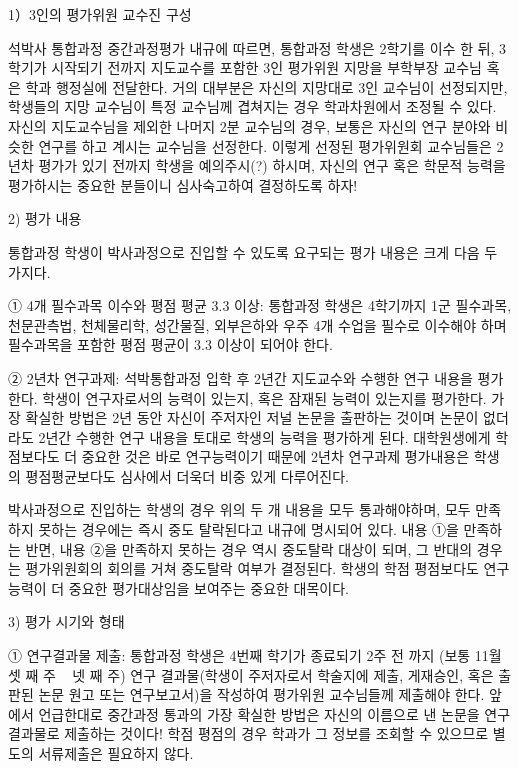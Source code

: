  
1）3인의 평가위원 교수진 구성

석박사 통합과정 중간과정평가 내규에 따르면, 통합과정 학생은 2학기를 이수 한 뒤,
3학기가 시작되기 전까지 지도교수를 포함한 3인 평가위원 지망을 부학부장 교수님
혹은 학과 행정실에 전달한다. 거의 대부분은 자신의 지망대로 3인 교수님이
선정되지만, 학생들의 지망 교수님이 특정 교수님께 겹쳐지는 경우 학과차원에서
조정될 수 있다. 자신의 지도교수님을 제외한 나머지 2분 교수님의 경우, 보통은
자신의 연구 분야와 비슷한 연구를 하고 계시는 교수님을 선정한다.  이렇게 선정된
평가위원회 교수님들은 2년차 평가가 있기 전까지 학생을 예의주시(?) 하시며, 자신의
연구 혹은 학문적 능력을 평가하시는 중요한 분들이니 심사숙고하여 결정하도록 하자!

2) 평가 내용

통합과정 학생이 박사과정으로 진입할 수 있도록 요구되는 평가 내용은 크게 다음 두
가지다.

① 4개 필수과목 이수와 평점 평균 3.3 이상: 통합과정 학생은 4학기까지 1군 필수과목,
천문관측법, 천체물리학, 성간물질, 외부은하와 우주 4개 수업을 필수로 이수해야 하며
필수과목을 포함한 평점 평균이 3.3 이상이 되어야 한다.

② 2년차 연구과제: 석박통합과정 입학 후 2년간 지도교수와 수행한 연구 내용을
평가한다. 학생이 연구자로서의 능력이 있는지, 혹은 잠재된 능력이 있는지를
평가한다.  가장 확실한 방법은 2년 동안 자신이 주저자인 저널 논문을 출판하는
것이며 논문이 없더라도 2년간 수행한 연구 내용을 토대로 학생의 능력을 평가하게
된다.  대학원생에게 학점보다도 더 중요한 것은 바로 연구능력이기 때문에 2년차
연구과제 평가내용은 학생의 평점평균보다도 심사에서 더욱더 비중 있게 다루어진다.

박사과정으로 진입하는 학생의 경우 위의 두 개 내용을 모두 통과해야하며, 모두
만족하지 못하는 경우에는 즉시 중도 탈락된다고 내규에 명시되어 있다.  내용 ①을
만족하는 반면, 내용 ②을 만족하지 못하는 경우 역시 중도탈락 대상이 되며, 그 반대의
경우는 평가위원회의 회의를 거쳐 중도탈락 여부가 결정된다.  학생의 학점 평점보다도
연구능력이 더 중요한 평가대상임을 보여주는 중요한 대목이다.

3) 평가 시기와 형태

① 연구결과물 제출: 통합과정 학생은 4번째 학기가 종료되기 2주 전 까지 (보통 11월
셋 째 주 ~ 넷 째 주) 연구 결과물(학생이 주저자로서 학술지에 제출, 게재승인, 혹은
출판된 논문 원고 또는 연구보고서)을 작성하여 평가위원 교수님들께 제출해야
한다. 앞에서 언급한대로 중간과정 통과의 가장 확실한 방법은 자신의 이름으로 낸
논문을 연구결과물로 제출하는 것이다!  학점 평점의 경우 학과가 그 정보를 조회할 수
있으므로 별도의 서류제출은 필요하지 않다.

